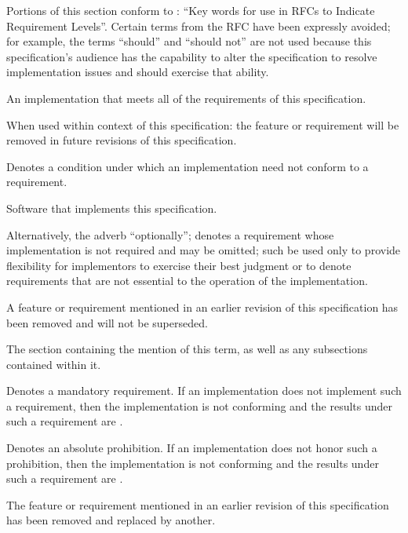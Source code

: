 %

\label{s:specdfn}

Portions of this section conform to : ``Key words for use in RFCs to
Indicate Requirement Levels''. Certain terms from the RFC have been expressly
avoided; for example, the terms ``should'' and ``should not'' are not used
because this specification's audience has the capability to alter the
specification to resolve implementation issues and should exercise that ability.

\begin{description}
  An implementation that meets all of the requirements of this specification.

  When used within context of this specification: the feature or requirement
  will be removed in future revisions of this specification.

  Denotes a condition under which an implementation need not conform to a
  requirement.

  Software that implements this specification.

  Alternatively, the adverb ``optionally''; denotes a requirement whose
  implementation is not required and may be omitted; such \shall be used only to
  provide flexibility for implementors to exercise their best judgment or to
  denote requirements that are not essential to the operation of the
  implementation.

  A feature or requirement mentioned in an earlier revision of this
  specification has been removed and will not be superseded.

  The section containing the mention of this term, as well as any subsections
  contained within it.

  Denotes a mandatory requirement. If an implementation does not implement such
  a requirement, then the implementation is not conforming and the results under
  such a requirement are \undefined.

  Denotes an absolute prohibition. If an implementation does not honor such a
  prohibition, then the implementation is not conforming and the results under
  such a requirement are \undefined.

  The feature or requirement mentioned in an earlier revision of this
  specification has been removed and replaced by another.


\end{description}
